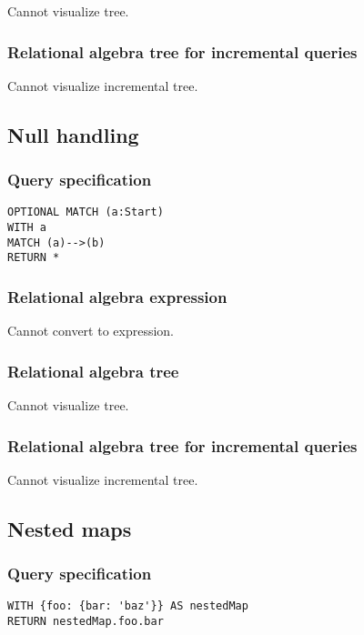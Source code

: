 Cannot visualize tree.

\subsubsection*{Relational algebra tree for incremental queries}

Cannot visualize incremental tree.

\subsection{Null handling}

\subsubsection*{Query specification}

\begin{lstlisting}
OPTIONAL MATCH (a:Start)
WITH a
MATCH (a)-->(b)
RETURN *
\end{lstlisting}

\subsubsection*{Relational algebra expression}

Cannot convert to expression.

\subsubsection*{Relational algebra tree}

Cannot visualize tree.

\subsubsection*{Relational algebra tree for incremental queries}

Cannot visualize incremental tree.

\subsection{Nested maps}

\subsubsection*{Query specification}

\begin{lstlisting}
WITH {foo: {bar: 'baz'}} AS nestedMap
RETURN nestedMap.foo.bar
\end{lstlisting}


